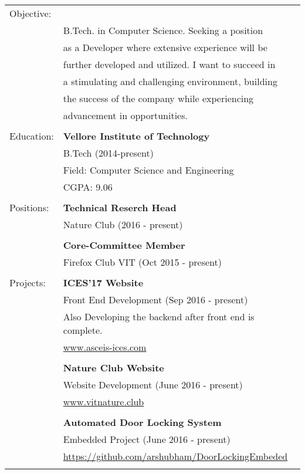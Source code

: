 \documentclass[letterpaper,11pt,oneside]{article}
\begin{document}
\noindent \begin{tabular}{@{} l l}
 \LARGE{Objective:}  &\noindent{Energetic and Passionate Student working towards}\\
 & B.Tech. in Computer Science. Seeking a position  \\
 & as a Developer where extensive experience will be \\ & further developed and utilized. I  want to succeed in\\
 & a stimulating and challenging 
 environment, building \\ & the success of the company  while experiencing\\ 
&  advancement in opportunities.\\
 &\\
 \LARGE{Education:}    & \textbf{Vellore Institute of Technology} \\
     & B.Tech (2014-present) \\
     & Field: Computer Science and Engineering \\
     & CGPA: 9.06 \\
     & \\
 \LARGE{Positions:}    &  \textbf{Technical Reserch Head} \\
    & Nature Club (2016 - present) \\
    & \\
    &  \textbf{Core-Committee Member}\\
    &  Firefox Club VIT (Oct 2015 - present) \\
    &  \\
 \LARGE{Projects:}    & \textbf{ICES'17 Website} \\
     & Front End Development (Sep 2016 - present) \\
     & Also Developing the backend after front end is complete. \\
     & \href{http://www.asceis-ices.com}{www.asceis-ices.com} \\
     & \\
     
      & \textbf{Nature Club Website} \\
     & Website Development (June 2016 - present) \\
     & \href{http://vitnature.club}{www.vitnature.club} \\
     & \\
     
     & \textbf{Automated Door Locking System} \\
     & Embedded Project (June 2016 - present) \\
     & \href{https://github.com/arshubham/DoorLockingEmbeded}{https://github.com/arshubham/DoorLockingEmbeded} \\
     & \\
     

\end{tabular}
\end{document}
